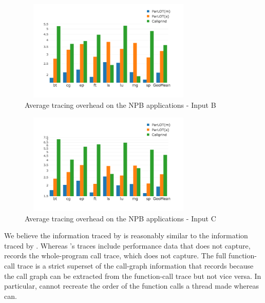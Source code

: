 \begin{figure}[t]
\centering
\includegraphics[width=3.4in,height=1.9in]{parlot/figs.comet.newMed/comet_chartAvg_sd_B_p3_5.png}
\caption{Average tracing overhead on the NPB applications - Input B}
\label{comet_chartAvg_sd_B_p3_5}
\end{figure}

\begin{figure}[t]
\centering
\includegraphics[width=3.4in,height=1.9in]{parlot/figs.comet.newMed/comet_chartAvg_sd_C_p3_5.png}
\caption{ Average tracing overhead on the NPB applications - Input C}
\label{comet_chartAvg_sd_C_p3_5}
\end{figure}


We believe the information traced by \callgrind is reasonably similar to the information traced by \parlotm.
%
Whereas \callgrind 's traces include performance data that \parlot does not capture, \parlot records the whole-program call trace, which \callgrind does not capture.
%
The full function-call trace is a strict superset of the call-graph information that \callgrind records because the call graph can be extracted from the function-call trace but not vice versa.
%
In particular, \callgrind cannot recreate the order of the function calls a thread made whereas \parlot can.
